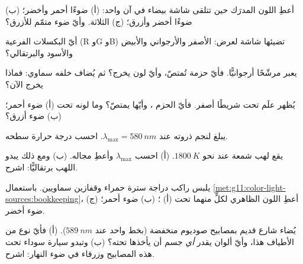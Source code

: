 \begin{exercise}[$\star$]\label{exo:g11:color-light-sources:1}
أعطِ اللون المدرَك حين تتلقى شاشة بيضاء في آن واحد:
(أ) ضوءًا أحمر وأخضر؛ (ب) ضوءًا أخضر وأزرق؛ (ج) 
الثلاثة. وأيّ ضوء متمّم للأزرق؟
\end{exercise}

\begin{exercise}[$\star$]\label{exo:g11:color-light-sources:2}
أيّ البكسلات الفرعية (R وG وB) تضيئها شاشة لعرض:
الأصفر والأرجواني والأبيض والأسود والبرتقالي؟
\end{exercise}

\begin{exercise}[$\star$]\label{exo:g11:color-light-sources:3}
يعبر  مرشّحًا أرجوانيًّا. فأيّ حزمة تُمتصّ، وأيّ
لون يخرج؟ ثم يُضاف خلفه  سماوي: فماذا يخرج الآن؟
\end{exercise}

\begin{exercise}[$\star$]\label{exo:g11:color-light-sources:4}
يُظهر علَم تحت  شريطًا أصفر. فأيّ الحزم ، وأيّها
يمتصّ؟ وما لونه تحت (أ) ضوء أحمر؛ (ب) ضوء أزرق؟
\end{exercise}

\begin{exercise}[$\star$]\label{exo:g11:color-light-sources:5}
يبلغ  لنجم ذروته عند $\lambda_{\max} = \qty{580}{nm}$.
احسب درجة حرارة سطحه.
\end{exercise}

\begin{exercise}[$\star\star$]\label{exo:g11:color-light-sources:6}
يقع لهب شمعة عند نحو $\qty{1800}{K}$. (أ) احسب
$\lambda_{\max}$ وأعطِ مجاله. (ب) ومع ذلك يبدو اللهب
برتقاليًّا: اشرح.
\end{exercise}

\begin{exercise}[$\star\star$]\label{exo:g11:color-light-sources:7}
يلبس راكب دراجة سترة حمراء وقفازين سماويين. باستعمال
\cref{met:g11:color-light-sources:bookkeeping}، أعطِ اللون الظاهري
لكلٍّ منهما تحت (أ) ؛ (ب) ضوء أحمر؛ (ج) ضوء أخضر.
\end{exercise}

\begin{exercise}[$\star\star$]\label{exo:g11:color-light-sources:8}
يُضاء شارع قديم بمصابيح صوديوم منخفضة  (بخط واحد عند
$\qty{589}{nm}$). (أ) فأيّ نوع من الأطياف هذا، وأيّ ألوان
يقدر \emph{أي} جسم أن يأخذها تحته؟ (ب) وتبدو سيارة سوداء تحت هذه
المصابيح وزرقاء في ضوء النهار: اشرح.
\end{exercise}

